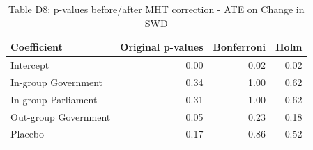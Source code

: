 \begin{table}[H]
\centering
\caption{Table D8: p-values before/after MHT correction - ATE on Change in SWD}
\centering
\begin{tabular}[t]{lrrr}
\toprule
Coefficient & Original p-values & Bonferroni & Holm\\
\midrule
Intercept & 0.00 & 0.02 & 0.02\\
In-group Government & 0.34 & 1.00 & 0.62\\
In-group Parliament & 0.31 & 1.00 & 0.62\\
Out-group Government & 0.05 & 0.23 & 0.18\\
Placebo & 0.17 & 0.86 & 0.52\\
\bottomrule
\end{tabular}
\end{table}
